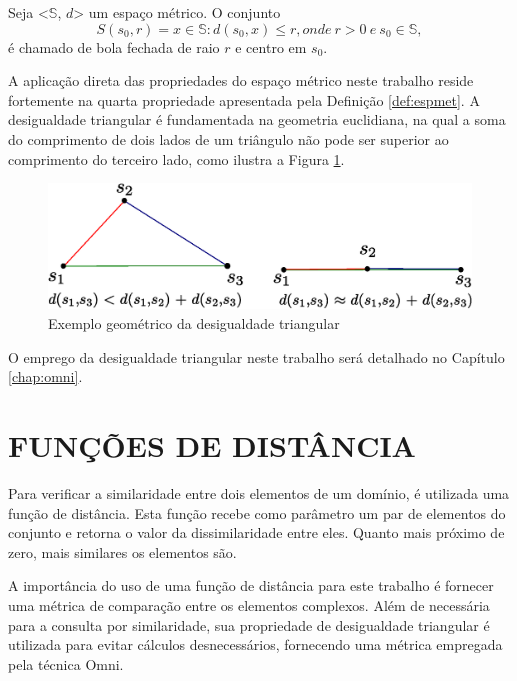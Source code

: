 \begin{mydef}
 \label{def:bola}
 Seja <$\mathbb{S}$, $d$> um espaço métrico. O conjunto
 \begin{equation}
  S(s_0,r) = {x \in \mathbb{S} : d(s_0, x) \leq r},	onde\ r > 0\ e\ s_0 \in \mathbb{S},
 \end{equation}
  é chamado de bola fechada de raio $r$ e centro em $s_0$. 
\end{mydef}

A aplicação direta das propriedades do espaço métrico neste trabalho reside fortemente na quarta propriedade apresentada pela Definição \ref{def:espmet}. A desigualdade triangular é fundamentada na geometria euclidiana, 
na qual a soma do comprimento de dois lados de um triângulo não pode ser superior ao comprimento do terceiro lado, como ilustra a Figura \ref{fig:destri}.

\begin{figure}[H]
\centering
\includegraphics[width=.8\textwidth]{dados/figuras/desig_tri.eps}
\caption{Exemplo geométrico da desigualdade triangular}
\label{fig:destri}
\end{figure}

O emprego da desigualdade triangular neste trabalho será detalhado no Capítulo \ref{chap:omni}.

\section{FUNÇÕES DE DISTÂNCIA}
\label{sec:funcdist}
Para verificar a similaridade entre dois elementos de um domínio, é utilizada uma função de distância. Esta função recebe como parâmetro um par
de elementos do conjunto e retorna o valor da dissimilaridade entre eles. Quanto mais próximo de zero, mais similares os elementos são.\par

A importância do uso de uma função de distância para este trabalho é fornecer uma métrica de comparação entre os elementos complexos. Além de
necessária para a consulta por similaridade, sua propriedade de desigualdade triangular é utilizada para evitar cálculos desnecessários, fornecendo uma métrica
empregada pela técnica Omni.\par
